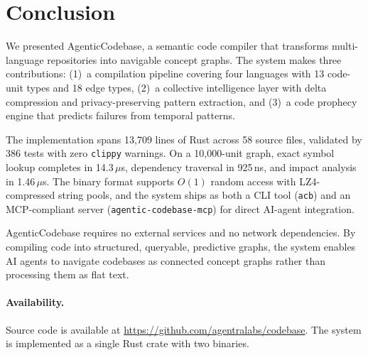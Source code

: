 \documentclass[10pt, twocolumn]{article}
\begin{document}
\section{Conclusion}
\label{sec:conclusion}

We presented AgenticCodebase, a semantic code compiler that transforms multi-language repositories into navigable concept graphs. The system makes three contributions: (1)~a compilation pipeline covering four languages with 13 code-unit types and 18 edge types, (2)~a collective intelligence layer with delta compression and privacy-preserving pattern extraction, and (3)~a code prophecy engine that predicts failures from temporal patterns.

The implementation spans 13{,}709 lines of Rust across 58 source files, validated by 386 tests with zero \texttt{clippy} warnings. On a 10{,}000-unit graph, exact symbol lookup completes in 14.3\,$\mu$s, dependency traversal in 925\,ns, and impact analysis in 1.46\,$\mu$s. The binary format supports $O(1)$ random access with LZ4-compressed string pools, and the system ships as both a CLI tool (\texttt{acb}) and an MCP-compliant server (\texttt{agentic-codebase-mcp}) for direct AI-agent integration.

AgenticCodebase requires no external services and no network dependencies. By compiling code into structured, queryable, predictive graphs, the system enables AI agents to navigate codebases as connected concept graphs rather than processing them as flat text.

\paragraph{Availability.} Source code is available at \url{https://github.com/agentralabs/codebase}. The system is implemented as a single Rust crate with two binaries.




\end{document}
